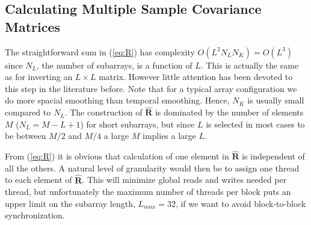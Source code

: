 \documentclass[journal]{IEEEtran}
\newcommand{\mat}[1]{\mathbf{#1}}
\begin{document}


\subsection{Calculating Multiple Sample Covariance Matrices}

The straightforward sum in (\ref{eq:R}) has complexity $O(L^2N_LN_K) = O(L^3)$ since $N_L$, the number of subarrays, is a function of $L$. This is actually the same as for inverting an $L \times L$ matrix. However little attention has been devoted to this step in the literature before. Note that for a typical array configuration we do more spacial smoothing than temporal smoothing. Hence, $N_K$ is usually small compared to $N_L$. The construction of $\mat{\hat{R}}$ is dominated by the number of elements $M$ ($N_L = M - L + 1$) for short subarrays, but since $L$ is selected in most cases to be between $M/2$ and $M/4$ a large $M$ implies a large $L$.

From (\ref{eq:R}) it is obvious that calculation of one element in $\mat{\hat{R}}$ is independent of all the others. A natural level of granularity would then be to assign one thread to each element of $\mat{\hat{R}}$. This will minimize global reads and writes needed per thread, but unfortunately the maximum number of threads per block puts an upper limit on the subarray length, $L_{max}=32$, if we want to avoid block-to-block synchronization.
\end{document}
